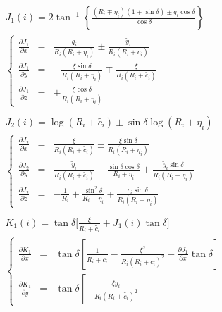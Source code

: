\documentclass{jarticle}
\newcommand{\yy}[1]{\tilde{y}_#1}
\newcommand{\cc}[1]{\tilde{c}_#1}
\newcommand{\re}[1]{R_#1+\eta_#1}
\newcommand{\rc}[1]{R_#1+\tilde{c_#1}}
\begin{document}
\begin{eqnarray*}
    &&J_1(i)=2\tan^{-1}\left\{
        \frac{(R_i\mp\eta_i)(1+\sin\delta)\pm q_i\cos\delta}{\cos\delta}
    \right\}\\
    &&\left\{
        \begin{array}{lcl}
            \displaystyle \frac{\partial J_1}{\partial x}
            &=&
            \displaystyle \frac{q_i}{R_i(\re{i})}\pm\frac{\yy{i}}{R_i(\rc{i})}\\
%
            \displaystyle \frac{\partial J_1}{\partial y}
            &=&
            \displaystyle -\frac{\xi\sin\delta}{R_i(\re{i})}\mp\frac{\xi}{R_i(\rc{i})}\\
%
            \displaystyle \frac{\partial J_1}{\partial z}
            &=&
            \displaystyle \pm\frac{\xi\cos\delta}{R_i(\re{i})}
        \end{array}
    \right.\\
    \\
    &&J_2(i)=\log(\rc{i})\pm\sin\delta\log(\re{i})\\
    &&\left\{
        \begin{array}{lcl}
            \displaystyle \frac{\partial J_2}{\partial x}
            &=&
            \displaystyle
            \frac{\xi}{R_i(\rc{i})}\pm\frac{\xi\sin\delta}{R_i(\re{i})}\\
%
            \displaystyle \frac{\partial J_2}{\partial y}
            &=&
            \displaystyle
            \frac{\yy{i}}{R_i(\rc{i})}
            \pm\frac{\sin\delta\cos\delta}{\re{i}}
            \pm\frac{\yy{i}\sin\delta}{R_i(\re{i})}\\
%
            \displaystyle \frac{\partial J_2}{\partial z}
            &=&
            \displaystyle
            -\frac{1}{R_i}
            +\frac{\sin^2\delta}{\re{i}}
            \mp\frac{\cc{i}\sin\delta}{R_i(\re{i})}
        \end{array}
    \right.\\
    \\
    &&K_1(i)=\tan\delta\biggr[\frac{\xi}{\rc{i}}+J_1(i)\tan\delta\biggr]\\
    &&\left\{
        \begin{array}{lcl}
            \displaystyle \frac{\partial K_1}{\partial x}
            &=&
            \displaystyle \tan\delta\left[\frac{1}{\rc{i}}-\frac{\xi^2}{R_i(\rc{i})^2}
                +\frac{\partial J_1}{\partial x}\tan\delta\right]\\
%
            \displaystyle \frac{\partial K_1}{\partial y}
            &=&
            \displaystyle \tan\delta\left[ -\frac{\xi\yy{i}}{R_i(\rc{i})^2}

\end{array}
\end{eqnarray*}
\end{document}
